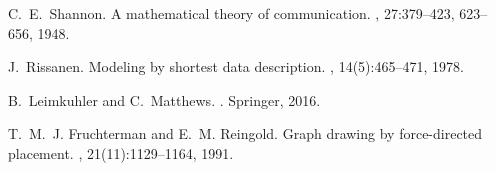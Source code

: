 \documentclass[11pt,a4paper]{article}
\begin{document}

\begin{thebibliography}{10}

C.~E.~Shannon.
\newblock A mathematical theory of communication.
, 27:379--423, 623--656, 1948.

J.~Rissanen.
\newblock Modeling by shortest data description.
, 14(5):465--471, 1978.

B.~Leimkuhler and C.~Matthews.
.
\newblock Springer, 2016.

T.~M.~J. Fruchterman and E.~M. Reingold.
\newblock Graph drawing by force-directed placement.
, 21(11):1129--1164, 1991.

\end{thebibliography}
\end{document}
